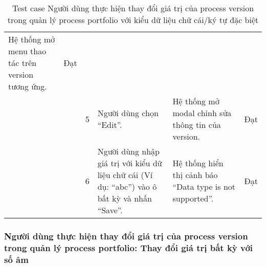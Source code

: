 \begin{table}[H]
{\begin{tabular}{|p{3cm}|p{1.5cm}|p{0.5cm}|p{4cm}|p{4cm}|>{\centering\arraybackslash}p{1cm}|}
            Hệ thống mở menu thao tác trên version tương ứng. &
            Đạt \\ \cline{3-6} 
            &
            &
            \multicolumn{1}{c|}{5} &
            Người dùng chọn “Edit”. &
            Hệ thống mở modal chỉnh sửa thông tin của version. &
            Đạt \\ \cline{3-6} 
            &
            &
            \multicolumn{1}{c|}{6} &
            Người dùng nhập giá trị với kiểu dữ liệu chữ cái (Ví dụ: “abc”) vào ô bất kỳ và nhấn “Save”. &
            Hệ thống hiển thị cảnh báo “Data type is not supported”. &
            Đạt \\ \cline{3-6} \hline
        \end{tabular}
    }
    \caption{Test case Người dùng thực hiện thay đổi giá trị của process version trong quản lý process portfolio với kiểu dữ liệu chữ cái/ký tự đặc biệt}
\end{table}

\subsubsection{Người dùng thực hiện thay đổi giá trị của process version trong quản lý process portfolio: Thay đổi giá trị bất kỳ với số âm}

